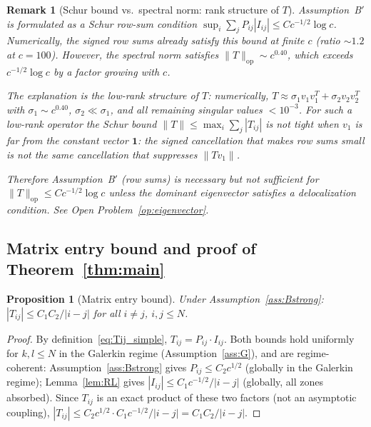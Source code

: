 \documentclass[12pt,a4paper]{article}
\newtheorem{proposition}[theorem]{Proposition}
\newtheorem{remark}[theorem]{Remark}
\begin{document}
\begin{remark}[Schur bound vs.\ spectral norm: rank structure of $T$]
\label{rem:rank}
Assumption~B$'$ is formulated as a Schur row-sum condition
$\sup_i \sum_j P_{ij}|I_{ij}| \leq Cc^{-1/2}\log c$.
Numerically, the signed row sums already satisfy this bound
at finite $c$ (ratio $\sim 1.2$ at $c=100$).
However, the spectral norm satisfies $\|T\|_{\mathrm{op}} \sim c^{0.40}$,
which exceeds $c^{-1/2}\log c$ by a factor growing with $c$.

The explanation is the \emph{low-rank structure} of $T$: numerically,
$T \approx \sigma_1 v_1 v_1^T + \sigma_2 v_2 v_2^T$
with $\sigma_1 \sim c^{0.40}$, $\sigma_2 \ll \sigma_1$,
and all remaining singular values $< 10^{-3}$.
For such a low-rank operator the Schur bound
$\|T\| \leq \max_i \sum_j |T_{ij}|$
is not tight when $v_1$ is far from the constant vector $\mathbf{1}$:
the signed cancellation that makes row sums small
is \emph{not} the same cancellation that suppresses $\|Tv_1\|$.

Therefore Assumption~B$'$ (row sums) is \emph{necessary but not
sufficient} for $\|T\|_{\mathrm{op}} \leq Cc^{-1/2}\log c$
unless the dominant eigenvector satisfies a delocalization condition.
See Open Problem~\ref{op:eigenvector}.
\end{remark}

\subsection{Matrix entry bound and proof of Theorem~\ref{thm:main}}

\begin{proposition}[Matrix entry bound]\label{prop:Tij}
Under Assumption~\ref{ass:Bstrong}: $|T_{ij}|\leq C_1C_2/|i-j|$
for all $i\neq j$, $i,j\leq N$.
\end{proposition}

\begin{proof}
By definition~\eqref{eq:Tij_simple}, $T_{ij}=P_{ij}\cdot I_{ij}$.
Both bounds hold uniformly for $k,l\leq N$ in the Galerkin
regime (Assumption~\ref{ass:G}), and are regime-coherent:
Assumption~\ref{ass:Bstrong} gives $P_{ij}\leq C_2c^{1/2}$
(globally in the Galerkin regime);
Lemma~\ref{lem:RL} gives $|I_{ij}|\leq C_1c^{-1/2}/|i-j|$
(globally, all zones absorbed).
Since $T_{ij}$ is an exact product of these two factors
(not an asymptotic coupling),
$|T_{ij}|\leq C_2c^{1/2}\cdot C_1c^{-1/2}/|i-j|=C_1C_2/|i-j|$.
\end{proof}
\end{document}

